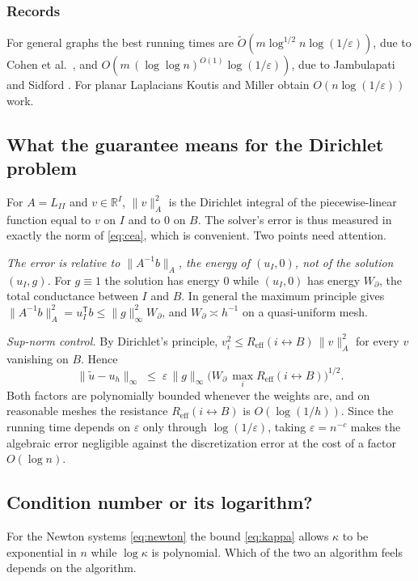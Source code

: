 \documentclass[11pt]{amsart}
\theoremstyle{definition}
\theoremstyle{remark}
\newcommand{\R}{\mathbb{R}}
\newcommand{\Reff}{R_{\mathrm{eff}}}
\newcommand{\Ot}{\widetilde{O}}
\newcommand{\eps}{\varepsilon}
\begin{document}
\subsubsection*{Records}
For general graphs the best running times are $\Ot(m\log^{1/2}n\log(1/\eps))$, due to Cohen et al.\ \cite{CKMPPRX14}, and
$O(m\,(\log\log n)^{O(1)}\log(1/\eps))$, due to Jambulapati and Sidford \cite{JS21}. For planar Laplacians Koutis and Miller \cite{KM07} obtain $O(n\log(1/\eps))$ work.

\subsection{What the guarantee means for the Dirichlet problem}
For $A=L_{II}$ and $v\in\R^I$, $\|v\|_A^2$ is the Dirichlet integral of the piecewise-linear function equal to $v$ on $I$ and to $0$ on $B$. The solver's error is thus measured in exactly the norm of \eqref{eq:cea}, which is convenient. Two points need attention.

\emph{The error is relative to $\|A^{-1}b\|_A$, the energy of $(u_I,0)$, not of the solution $(u_I,g)$.} For $g\equiv1$ the solution has energy $0$ while $(u_I,0)$ has energy $W_\partial$, the total conductance between $I$ and $B$.
In general the maximum principle gives $\|A^{-1}b\|_A^2=u_I^{\mathsf T}b\le\|g\|_\infty^2W_\partial$, and $W_\partial\asymp h^{-1}$ on a quasi-uniform mesh.

\emph{Sup-norm control.} By Dirichlet's principle, $v_i^2\le\Reff(i\leftrightarrow B)\,\|v\|_A^2$ for every $v$ vanishing on $B$. Hence
\[
\|\tilde u-u_h\|_\infty\;\le\;\eps\,\|g\|_\infty\bigl(W_\partial\,\max_i\Reff(i\leftrightarrow B)\bigr)^{1/2}.
\]
Both factors are polynomially bounded whenever the weights are, and on reasonable meshes the resistance $\Reff(i\leftrightarrow B)$ is $O(\log(1/h))$. Since the running time depends on $\eps$ only through $\log(1/\eps)$, taking $\eps=n^{-c}$ makes the algebraic error negligible
against the discretization error at the cost of a factor $O(\log n)$.

\subsection{Condition number or its logarithm?}\label{sec:logkappa}
For the Newton systems \eqref{eq:newton} the bound \eqref{eq:kappa} allows $\kappa$ to be exponential in $n$ while $\log\kappa$ is polynomial. Which of the two an algorithm feels depends on the algorithm.
\end{document}
